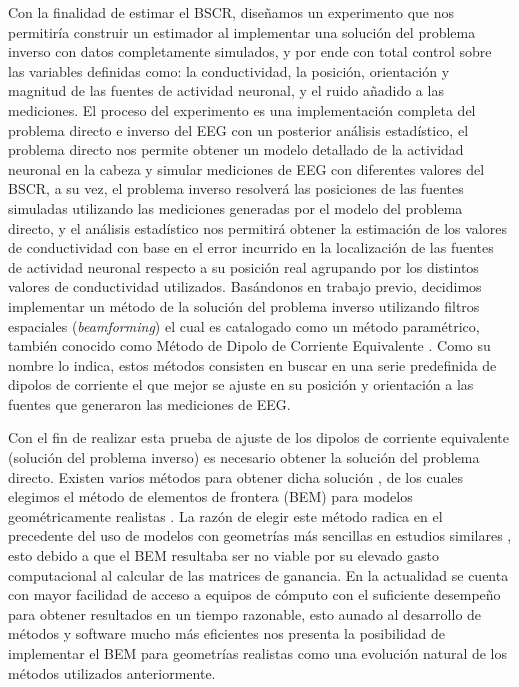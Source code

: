 Con la finalidad de estimar el BSCR, diseñamos un experimento que nos permitiría construir un estimador al implementar una solución del problema inverso con datos completamente simulados, y por ende con total control sobre las variables definidas como: la conductividad, la posición, orientación y magnitud de las fuentes de actividad neuronal, y el ruido añadido a las mediciones. El proceso del experimento es una implementación completa del problema directo e inverso del EEG con un posterior análisis estadístico, el problema directo nos permite obtener un modelo detallado de la actividad neuronal en la cabeza y simular mediciones de EEG con diferentes valores del BSCR, a su vez, el problema inverso resolverá las posiciones de las fuentes simuladas utilizando las mediciones generadas por el modelo del problema directo, y el análisis estadístico nos permitirá obtener la estimación de los valores de conductividad con base en el error incurrido en la localización de las fuentes de actividad neuronal respecto a su posición real agrupando por los distintos valores de conductividad utilizados. Basándonos en trabajo previo, decidimos implementar un método de la solución del problema inverso utilizando filtros espaciales (\emph{beamforming}) el cual es catalogado como un método paramétrico, también conocido como Método de Dipolo de Corriente Equivalente \cite{Grech2008}. Como su nombre lo indica, estos métodos consisten en buscar en una serie predefinida de dipolos de corriente el que mejor se ajuste en su posición y orientación a las fuentes que generaron las mediciones de EEG. 

Con el fin de realizar esta prueba de ajuste de los dipolos de corriente equivalente (solución del problema inverso) es necesario obtener la solución del problema directo. Existen varios métodos para obtener dicha solución \cite{Mosher1999}, de los cuales elegimos el método de elementos de frontera (BEM) para modelos geométricamente realistas \cite{Ermer2001}. La razón de elegir este método radica en el precedente del uso de modelos con geometrías más sencillas en estudios similares \cite{Gutierrez2004}, esto debido a que el BEM resultaba ser no viable por su elevado gasto computacional al calcular de las matrices de ganancia. En la actualidad se cuenta con mayor facilidad de acceso a equipos de cómputo con el suficiente desempeño para obtener resultados en un tiempo razonable, esto aunado al desarrollo de métodos y software mucho más eficientes \cite{open,Clerc2010} nos presenta la posibilidad de implementar el BEM para geometrías realistas como una evolución natural de los métodos utilizados anteriormente.

